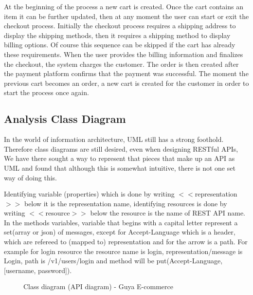 At the beginning of the process a new cart is created. Once the cart contains an item it can be further updated, then at any moment the user can start or exit the checkout process. Initially the checkout process requires a shipping address to display the shipping methods, then it requires a shipping method to display billing options. Of course this sequence can be skipped if the cart has already these requirements.
When the user provides the billing information and finalizes the checkout, the system charges the customer. The order is then created after the payment platform confirms that the payment was successful. The moment the previous cart becomes an order, a new cart is created for the customer in order to start the process once again.


\subsection{Analysis Class Diagram}
In the world of information architecture, UML still has a strong foothold. Therefore class diagrams are still desired, even when designing RESTful APIs, We have there sought a way to represent that pieces that make up an 	API as UML and found that although this is somewhat intuitive, there is not one set way of doing this.

Identifying variable (properties) which is done by writing $<<$representation$>>$ below it is the representation name, identifying resources is done by writing $<<$resource$>>$ below the resource is the name of REST API name. In the methods variables, variable that begins with a capital letter represent a set(array or json) of messages, except for Accept-Language which is a header, which are refereed to (mapped to) representation and for the arrow is a path. For example for login resource the resource name is login, representation/message is Login, path is /v1/users/login and method will be put(Accept-Language, [username, password]).


\begin{figure}[!h]
\hspace*{-3cm}
\caption{Class diagram (API diagram) - Guya E-commerce}
\end{figure}
\clearpage


